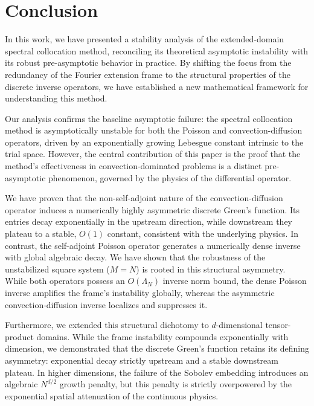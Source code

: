 \documentclass[pdflatex,sn-mathphys-num]{sn-jnl}%
\theoremstyle{thmstyleone}%
\begin{document}
\section{Conclusion}

In this work, we have presented a stability analysis of the extended-domain spectral collocation method, reconciling its theoretical asymptotic instability with its robust pre-asymptotic behavior in practice. By shifting the focus from the redundancy of the Fourier extension frame to the structural properties of the discrete inverse operators, we have established a new mathematical framework for understanding this method.

Our analysis confirms the baseline asymptotic failure: the spectral collocation method is asymptotically unstable for both the Poisson and convection-diffusion operators, driven by an exponentially growing Lebesgue constant intrinsic to the trial space. However, the central contribution of this paper is the proof that the method's effectiveness in convection-dominated problems is a distinct pre-asymptotic phenomenon, governed by the physics of the differential operator.

We have proven that the non-self-adjoint nature of the convection-diffusion operator induces a numerically highly asymmetric discrete Green's function. Its entries decay exponentially in the upstream direction, while downstream they plateau to a stable, $O(1)$ constant, consistent with the underlying physics. In contrast, the self-adjoint Poisson operator generates a numerically dense inverse with global algebraic decay. We have shown that the robustness of the unstabilized square system ($M=N$) is rooted in this structural asymmetry. While both operators possess an $O(\Lambda_N)$ inverse norm bound, the dense Poisson inverse amplifies the frame's instability globally, whereas the asymmetric convection-diffusion inverse localizes and suppresses it.

Furthermore, we extended this structural dichotomy to $d$-dimensional tensor-product domains. While the frame instability compounds exponentially with dimension, we demonstrated that the discrete Green's function retains its defining asymmetry: exponential decay strictly upstream and a stable downstream plateau. In higher dimensions, the failure of the Sobolev embedding introduces an algebraic $N^{d/2}$ growth penalty, but this penalty is strictly overpowered by the exponential spatial attenuation of the continuous physics. 
\end{document}
